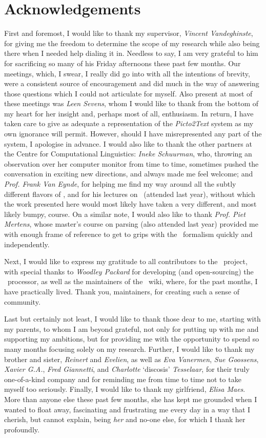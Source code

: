 \chapter*{Acknowledgements}

First and foremost, I would like to thank my supervisor, \emph{Vincent
Vandeghinste}, for giving me the freedom to determine the scope of my research
while also being there when I needed help dialing it in. Needless to say, I am
very grateful to him for sacrificing so many of his Friday afternoons these
past few months. Our meetings, which, I swear, I really did go into with all
the intentions of brevity, were a consistent source of encouragement and did
much in the way of answering those questions which I could not articulate for
myself. Also present at most of these meetings was \emph{Leen Sevens}, whom I
would like to thank from the bottom of my heart for her insight and, perhaps
most of all, enthusiasm. In return, I have taken care to give as adequate a
representation of the \emph{Picto2Text} system as my own ignorance will permit.
However, should I have misrepresented any part of the system, I apologise in
advance. I would also like to thank the other partners at the Centre for
Computational Linguistics: \emph{Ineke Schuurman}, who, throwing an observation
over her computer monitor from time to time, sometimes pushed the conversation
in exciting new directions, and always made me feel welcome; and \emph{Prof.
Frank Van Eynde}, for helping me find my way around all the subtly different
flavors of \hpsg, and for his lectures on \hpsg\ (attended last year), without
which the work presented here would most likely have taken a very different,
and most likely bumpy, course. On a similar note, I would also like to thank
\emph{Prof. Piet Mertens}, whose master's course on parsing (also attended last
year) provided me with enough frame of reference to get to grips with the
\delphin\ formalism quickly and independently.

Next, I would like to express my gratitude to all contributors to the \delphin\
project, with special thanks to \emph{Woodley Packard} for developing (and
open-sourcing) the \ace\ processor, as well as the maintainers of the \delphin\
wiki, where, for the past months, I have practically lived. Thank you,
maintainers, for creating such a sense of community.

Last but certainly not least, I would like to thank those dear to me, starting
with my parents, to whom I am beyond grateful, not only for putting up with me
and supporting my ambitions, but for providing me with the opportunity to spend
so many months focusing solely on my research. Further, I would like to thank
my brother and sister, \emph{Reinert} and \emph{Evelien}, as well as \emph{Eva
Vanermen}, \emph{Sue Goossens}, \emph{Xavier G.A.},  \emph{Fred Giannetti}, and
\emph{Charlotte} `discosis' \emph{Tesselaar}, for their truly one-of-a-kind
company and for reminding me from time to time not to take myself too
seriously. Finally, I would like to thank my girlfriend, \emph{Elisa Maes}.
More than anyone else these past few months, she has kept me grounded when I
wanted to float away, fascinating and frustrating me every day in a way that I
cherish, but cannot explain, being \emph{her} and no-one else, for which I
thank her profoundly.
